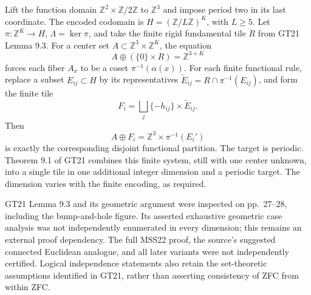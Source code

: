 \documentclass[10pt]{article}
\begin{document}
Lift the function domain \(\mathbb Z^2\times\mathbb Z/2\mathbb Z\) to \(\mathbb Z^3\) and impose period two in its last coordinate. The encoded codomain is \(H=(\mathbb Z/L\mathbb Z)^K\), with \(L\ge5\). Let \(\pi:\mathbb Z^K\to H\), \(\Lambda=\ker\pi\), and take the finite rigid fundamental tile \(R\) from GT21 Lemma 9.3. For a center set \(A\subset\mathbb Z^3\times\mathbb Z^K\), the equation \[A\oplus(\{0\}\times R)=\mathbb Z^{3+K}\] forces each fiber \(A_x\) to be a coset \(\pi^{-1}(\alpha(x))\). For each finite functional rule, replace a subset \(E_{ij}\subset H\) by its representatives \(\widetilde E_{ij}=R\cap\pi^{-1}(E_{ij})\), and form the finite tile \[F_i=\bigsqcup_j \{-h_{ij}\}\times\widetilde E_{ij}.\] Then \[A\oplus F_i=\mathbb Z^3\times\pi^{-1}(E_i')\] is exactly the corresponding disjoint functional partition. The target is periodic. Theorem 9.1 of GT21 combines this finite system, still with one center unknown, into a single tile in one additional integer dimension and a periodic target. The dimension varies with the finite encoding, as required.\par
GT21 Lemma 9.3 and its geometric argument were inspected on pp. 27–28, including the bump-and-hole figure. Its asserted exhaustive geometric case analysis was not independently enumerated in every dimension; this remains an external proof dependency. The full MSS22 proof, the source’s suggested connected Euclidean analogue, and all later variants were not independently certified. Logical independence statements also retain the set-theoretic assumptions identified in GT21, rather than asserting consistency of ZFC from within ZFC.\par
\end{document}
